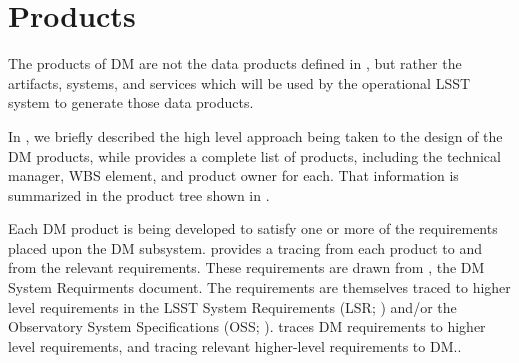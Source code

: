 \section{Products \label{sect:products}}

The products of DM are not the data products defined in ,
but rather the artifacts, systems, and services which will be used by the
operational LSST system to generate those data products.

In , we briefly described the high level approach being taken to the design of the DM products, while  provides a complete list of products, including the technical manager, WBS element, and product owner for each.
That information is summarized in the product tree shown in .

Each DM product is being developed to satisfy one or more of the requirements placed upon the DM subsystem.  provides a tracing from each product to and from the relevant requirements.
These requirements are drawn from , the DM System Requirments document.
The requirements  are themselves traced to higher level requirements in the LSST System Requirements (LSR; ) and/or the Observatory System Specifications (OSS; ).
 traces DM requirements to higher level requirements, and  tracing relevant  higher-level requirements to DM..

